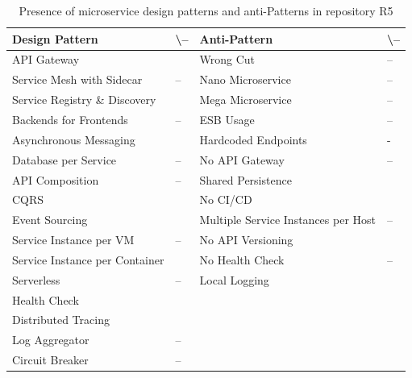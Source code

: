 \documentclass{Configuration_Files/PoliMi3i_thesis}
\newcommand{\cmark}{\ding{51}}%
\begin{document}
\begin{table}[H]
\centering 
    \begin{tabular}{ 
  | >{\centering\arraybackslash} m{16em} 
  | >{\centering\arraybackslash} m{2.2em} 
  | >{\centering\arraybackslash} m{16em} 
  | >{\centering\arraybackslash} m{2.2em} | }
    \hline
    \rowcolor{bluepoli!40}
    \textbf{Design Pattern} & \cmark \textbackslash – & \textbf{Anti-Pattern} & \cmark \textbackslash – \T\B \\
    \hline \hline
    API Gateway & \cmark & Wrong Cut & – \T\B\\
    \hline
    \rowcolor{bluepoli!10}
    Service Mesh with Sidecar & – & Nano Microservice & – \T\B \\
    \hline
    Service Registry \& Discovery & \cmark & Mega Microservice & – \T\B \\
    \hline
    \rowcolor{bluepoli!10}
    Backends for Frontends & – & ESB Usage & – \T\B \\
    \hline
    Asynchronous Messaging & \cmark & Hardcoded Endpoints & - \T\B \\
    \hline
    \rowcolor{bluepoli!10}
    Database per Service & – & No API Gateway & – \T\B \\
    \hline
    API Composition & – & Shared Persistence & \cmark \T\B \\
    \hline
    \rowcolor{bluepoli!10}
    CQRS & \cmark & No CI/CD & \cmark \T\B \\
    \hline
    Event Sourcing & \cmark & Multiple Service Instances per Host & – \T\B \\
    \hline
    \rowcolor{bluepoli!10}
    Service Instance per VM & – & No API Versioning & \cmark \T\B \\
    \hline
    Service Instance per Container & \cmark & No Health Check & – \T\B \\
    \hline
    \rowcolor{bluepoli!10}
    Serverless & – & Local Logging & \cmark \T\B \\
    \hline
    Health Check & \cmark &  & \T\B \\
    \hline
    \rowcolor{bluepoli!10}
    Distributed Tracing & \cmark & & \T\B \\
    \hline
    Log Aggregator & – &  & \T\B \\
    \hline
    \rowcolor{bluepoli!10}
    Circuit Breaker & – &  & \T\B \\
    \hline
    \end{tabular}
    \\[10pt]
    \caption{Presence of microservice design patterns and anti-Patterns in repository R5}
    \label{table:R5_result}
\end{table}
\end{document}

